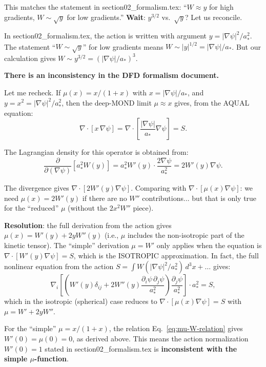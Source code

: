 \documentclass[11pt]{article}
\newcommand{\astar}{a_*}
\begin{document}
This matches the statement in section02\_formalism.tex:
``$W \approx y$ for high gradients, $W \sim \sqrt{y}$ for low gradients.''
\textbf{Wait}: $y^{3/2}$ vs.\ $\sqrt{y}$? Let us reconcile.

In section02\_formalism.tex, the action is written with argument
$y = |\nabla\psi|^2/\astar^2$. The statement ``$W \sim \sqrt{y}$''
for low gradients means $W \sim |y|^{1/2} = |\nabla\psi|/\astar$.
But our calculation gives $W \sim y^{3/2} = (|\nabla\psi|/\astar)^3$.

\textbf{There is an inconsistency in the DFD formalism document.}

Let me recheck. If $\mu(x) = x/(1+x)$ with $x = |\nabla\psi|/\astar$,
and $y = x^2 = |\nabla\psi|^2/\astar^2$, then the deep-MOND limit
$\mu \approx x$ gives, from the AQUAL equation:
\begin{equation}
\nabla\cdot[x\,\nabla\psi] = \nabla\cdot\left[\frac{|\nabla\psi|}{\astar}\nabla\psi\right] = S.
\end{equation}

The Lagrangian density for this operator is obtained from:
\begin{equation}
\frac{\partial}{\partial(\nabla\psi)}\left[\astar^2 W(y)\right]
= \astar^2 W'(y)\cdot\frac{2\nabla\psi}{\astar^2} = 2W'(y)\nabla\psi.
\end{equation}

The divergence gives $\nabla\cdot[2W'(y)\nabla\psi]$. Comparing with
$\nabla\cdot[\mu(x)\nabla\psi]$: we need $\mu(x) = 2W'(y)$ if there
are no $W''$ contributions... but that is only true for the ``reduced''
$\mu$ (without the $2x^2 W''$ piece).

\textbf{Resolution}: the full derivation from the action gives
$\mu(x) = W'(y) + 2y W''(y)$ (i.e., $\mu$ includes the
non-isotropic part of the kinetic tensor). The ``simple'' derivation
$\mu = W'$ only applies when the equation is $\nabla\cdot[W'(y)\nabla\psi] = S$,
which is the ISOTROPIC approximation. In fact, the full nonlinear
equation from the action $S = \int W(|\nabla\psi|^2/\astar^2)\,d^3x + \ldots$
gives:
\begin{equation}
\nabla_i\left[\left(W'(y)\delta_{ij} + 2W''(y)\frac{\partial_i\psi\,\partial_j\psi}{\astar^2}\right)\frac{\partial_j\psi}{\astar^2}\right]\cdot\astar^2 = S,
\end{equation}
which in the isotropic (spherical) case reduces to
$\nabla\cdot[\mu(x)\nabla\psi] = S$ with $\mu = W' + 2y W''$.

For the ``simple'' $\mu = x/(1+x)$, the relation Eq.~\eqref{eq:mu-W-relation}
gives $W'(0) = \mu(0) = 0$, as derived above. This means the action
normalization $W'(0) = 1$ stated in section02\_formalism.tex is
\textbf{inconsistent with the simple $\mu$-function}.
\end{document}
